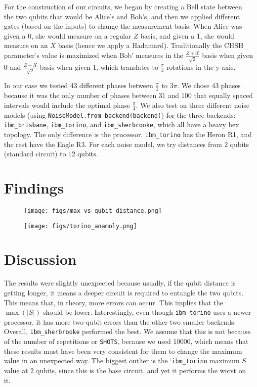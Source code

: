 \documentclass{article}
\begin{document}
For the construction of our circuits, we began by creating a Bell state between the two qubits that would be Alice's and Bob’s, and then we applied different gates (based on the inputs) to change the measurement basis. When Alice was given a $0$, she would measure on a regular $Z$ basis, and given a $1$, she would measure on an $X$ basis (hence we apply a Hadamard). Traditionally the CHSH parameter’s value is maximized when Bob’ measures in the $\frac{Z+X}{\sqrt2}$ basis when given $0$ and $\frac{Z-X}{\sqrt2}$ basis when given $1$, which translates to $\frac{\pi}{4}$ rotations in the y-axis. 

In our case we tested 43 different phases between $\frac{\pi}{2}$ to $3\pi$. We chose 43 phases because it was the only number of phases between 31 and 100 that equally spaced intervals would include the optimal phase $\frac{\pi}{4}$. We also test on three different noise models (using \verb|NoiseModel.from_backend(backend)|) for the three backends: \verb|ibm_brisbane|, \verb|ibm_torino|, and \verb|ibm_sherbrooke|, which all have a heavy hex topology. The only difference is the processor, \verb|ibm_torino| has the Heron R1, and the rest have the Eagle R3. For each noise model, we try distances from $2$ qubits (standard circuit) to $12$ qubits.

\section{Findings}



\begin{figure}
    \centering
    \texttt{[image: figs/max vs qubit distance.png]}
    \caption{}
    \label{fig:all}
\end{figure}

\begin{figure}
    \centering
    \texttt{[image: figs/torino\_anamoly.png]}
    \caption{}
    \label{fig:torino}
\end{figure}

\section{Discussion}
The results were slightly unexpected because usually, if the qubit distance is getting longer, it means a deeper circuit is required to entangle the two qubits. This means that, in theory, more errors can occur. This implies that the $\max(|S|)$ should be lower. Interestingly, even though  \verb|ibm_torino| uses a newer processor, it has more two-qubit errors than the other two smaller backends. Overall, \verb|ibm_sherbrooke| performed the best. We assume that this is not because of the number of repetitions or \verb|SHOTS|, because we used 10000, which means that these results must have been very consistent for them to change the maximum value in an unexpected way. The biggest outlier is the `\verb|ibm_torino| maximum $S$ value at $2$ qubits, since this is the base circuit, and yet it performs the worst on it.
\end{document}
